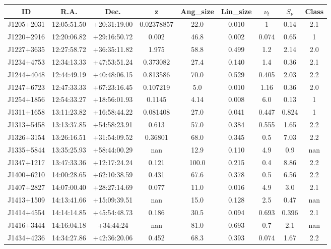 \begin{table}
    \centering
    \begin{tabular}{@{}ccccccccc@{}}
        \toprule
        ID & R.A. & Dec. & z & Ang\_size & Lin\_size & $\nu_t$ & $S_\nu$ & Class \\ \midrule
        J1205+2031 & 12:05:51.50 & +20:31:19.00 & 0.02378857 & 22.0 & 0.010 & 1 & 0.14 & 2.1 \\
        J1220+2916 & 12:20:06.82 & +29:16:50.72 & 0.002 & 46.8 & 0.002 & 0.074 & 0.65 & 1 \\
        J1227+3635 & 12:27:58.72 & +36:35:11.82 & 1.975 & 58.8 & 0.499 & 1.2 & 2.14 & 2.0 \\
        J1234+4753 & 12:34:13.33 & +47:53:51.24 & 0.373082 & 27.4 & 0.140 & 1.4 & 0.36 & 2.1 \\
        J1244+4048 & 12:44:49.19 & +40:48:06.15 & 0.813586 & 70.0 & 0.529 & 0.405 & 2.03 & 2.2 \\
        J1247+6723 & 12:47:33.33 & +67:23:16.45 & 0.107219 & 5.0 & 0.010 & 1.16 & 0.36 & 2.0 \\
        J1254+1856 & 12:54:33.27 & +18:56:01.93 & 0.1145 & 4.14 & 0.008 & 6.0 & 0.13 & 1 \\
        J1311+1658 & 13:11:23.82 & +16:58:44.22 & 0.081408 & 27.0 & 0.041 & 0.447 & 0.824 & 1 \\
        J1313+5458 & 13:13:37.85 & +54:58:23.91 & 0.613 & 57.0 & 0.384 & 0.555 & 1.65 & 2.2 \\
        J1326+3154 & 13:26:16.51 & +31:54:09.52 & 0.36801 & 68.0 & 0.345 & 0.5 & 7.03 & 2.2 \\
        J1335+5844 & 13:35:25.93 & +58:44:00.29 & nan & 12.9 & 0.110 & 4.9 & 0.9 & nan \\
        J1347+1217 & 13:47:33.36 & +12:17:24.24 & 0.121 & 100.0 & 0.215 & 0.4 & 8.86 & 2.2 \\
        J1400+6210 & 14:00:28.65 & +62:10:38.59 & 0.431 & 67.6 & 0.378 & 0.5 & 6.56 & 2.2 \\
        J1407+2827 & 14:07:00.40 & +28:27:14.69 & 0.077 & 11.0 & 0.016 & 4.9 & 3.0 & 2.1 \\
        J1413+1509 & 14:13:41.66 & +15:09:39.51 & nan & 15.0 & 0.128 & 2.5 & 0.47 & nan \\
        J1414+4554 & 14:14:14.85 & +45:54:48.73 & 0.186 & 30.5 & 0.094 & 0.693 & 0.396 & 2.1 \\
        J1416+3444 & 14:16:04.18 & +34:44:24 & nan & 81.0 & 0.693 & 0.7 & 2.1 & nan \\
        J1434+4236 & 14:34:27.86 & +42:36:20.06 & 0.452 & 68.3 & 0.393 & 0.074 & 1.67 & 2.2 \\

\end{tabular}
\end{table}
